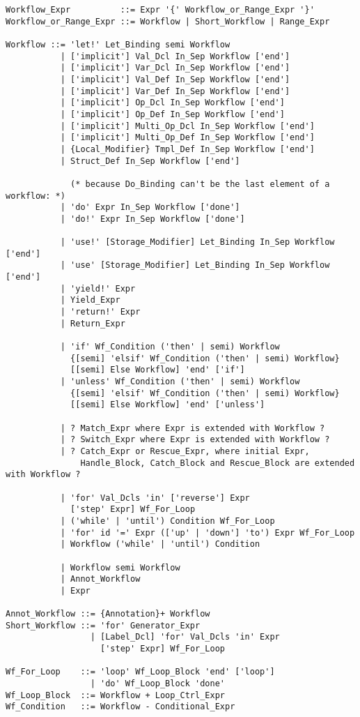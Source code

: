 \grammar\begin{lstlisting}[deletekeywords={is,with,or,is,and}]
Workflow_Expr          ::= Expr '{' Workflow_or_Range_Expr '}'
Workflow_or_Range_Expr ::= Workflow | Short_Workflow | Range_Expr

Workflow ::= 'let!' Let_Binding semi Workflow
           | ['implicit'] Val_Dcl In_Sep Workflow ['end']
           | ['implicit'] Var_Dcl In_Sep Workflow ['end']
           | ['implicit'] Val_Def In_Sep Workflow ['end']
           | ['implicit'] Var_Def In_Sep Workflow ['end']
           | ['implicit'] Op_Dcl In_Sep Workflow ['end']
           | ['implicit'] Op_Def In_Sep Workflow ['end']
           | ['implicit'] Multi_Op_Dcl In_Sep Workflow ['end']
           | ['implicit'] Multi_Op_Def In_Sep Workflow ['end']
           | {Local_Modifier} Tmpl_Def In_Sep Workflow ['end']
           | Struct_Def In_Sep Workflow ['end']
           
             (* because Do_Binding can't be the last element of a workflow: *)
           | 'do' Expr In_Sep Workflow ['done'] 
           | 'do!' Expr In_Sep Workflow ['done']
           
           | 'use!' [Storage_Modifier] Let_Binding In_Sep Workflow ['end']
           | 'use' [Storage_Modifier] Let_Binding In_Sep Workflow ['end']
           | 'yield!' Expr
           | Yield_Expr
           | 'return!' Expr
           | Return_Expr
           
           | 'if' Wf_Condition ('then' | semi) Workflow
             {[semi] 'elsif' Wf_Condition ('then' | semi) Workflow} 
             [[semi] Else Workflow] 'end' ['if']
           | 'unless' Wf_Condition ('then' | semi) Workflow
             {[semi] 'elsif' Wf_Condition ('then' | semi) Workflow} 
             [[semi] Else Workflow] 'end' ['unless']
             
           | ? Match_Expr where Expr is extended with Workflow ?
           | ? Switch_Expr where Expr is extended with Workflow ?
           | ? Catch_Expr or Rescue_Expr, where initial Expr, 
               Handle_Block, Catch_Block and Rescue_Block are extended with Workflow ?
           
           | 'for' Val_Dcls 'in' ['reverse'] Expr
             ['step' Expr] Wf_For_Loop
           | ('while' | 'until') Condition Wf_For_Loop
           | 'for' id '=' Expr (['up' | 'down'] 'to') Expr Wf_For_Loop
           | Workflow ('while' | 'until') Condition
           
           | Workflow semi Workflow
           | Annot_Workflow
           | Expr

Annot_Workflow ::= {Annotation}+ Workflow           
Short_Workflow ::= 'for' Generator_Expr
                 | [Label_Dcl] 'for' Val_Dcls 'in' Expr 
                   ['step' Expr] Wf_For_Loop

Wf_For_Loop    ::= 'loop' Wf_Loop_Block 'end' ['loop']
                 | 'do' Wf_Loop_Block 'done'
Wf_Loop_Block  ::= Workflow + Loop_Ctrl_Expr
Wf_Condition   ::= Workflow - Conditional_Expr
\end{lstlisting}

